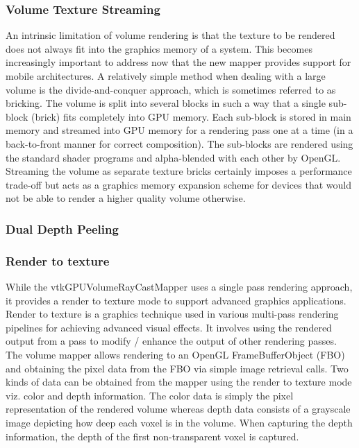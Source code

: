 \subsubsection{Volume Texture Streaming}
An intrinsic limitation of volume rendering is that the texture to be rendered does not always fit into the graphics memory of a system. This becomes increasingly important to address now that the new mapper provides support for mobile architectures.
A relatively simple method when dealing with a large volume is the divide-and-conquer approach, which is sometimes referred to as bricking. The volume is split into several blocks in such a way that a single sub-block (brick) fits completely into GPU memory.  Each sub-block is stored in main memory and streamed into GPU memory for a rendering pass one at a time (in a back-to-front manner for correct composition). The sub-blocks are rendered using the standard shader programs and alpha-blended with each other by OpenGL.
Streaming the volume as separate texture bricks certainly imposes a performance trade-off but acts as a graphics memory expansion scheme for devices that would not be able to render a higher quality volume otherwise.

\subsubsection{Dual Depth Peeling}
 
 
\subsubsection{Render to texture}
While the vtkGPUVolumeRayCastMapper uses a single pass rendering approach, it provides a render to texture mode to support advanced graphics applications. Render to texture is a graphics technique used in various multi-pass rendering pipelines for achieving advanced visual effects. It involves using the rendered output from a pass to modify / enhance the output of other rendering passes. The volume mapper allows rendering to an OpenGL FrameBufferObject (FBO) and obtaining the pixel data from the FBO via simple image retrieval calls. Two kinds of data can be obtained from  the mapper using the render to texture mode viz. color and depth information. The color data is simply the pixel representation of the rendered volume whereas depth data consists of a grayscale image depicting how deep each voxel is in the volume. When capturing the depth information, the depth of the first non-transparent voxel is captured.

